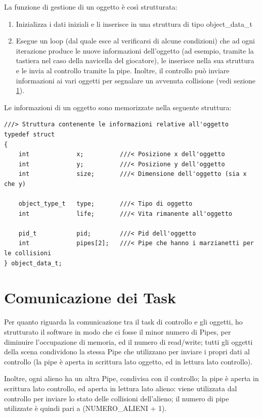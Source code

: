 \documentclass[a4paper,11pt]{report}
\begin{document}
La funzione di gestione di un oggetto è così strutturata:
\begin{enumerate}
  \item Inizializza i dati iniziali e li inserisce in una struttura di tipo object_data_t
  \item Esegue un loop (dal quale esce al verificarsi di alcune condizioni) che ad ogni iterazione 
    produce le nuove informazioni dell'oggetto (ad esempio, tramite la tastiera nel caso
    della navicella del giocatore), le inserisce nella sua struttura e le invia
    al controllo tramite la pipe. Inoltre, il controllo può inviare informazioni ai vari oggetti
    per segnalare un avvenuta collisione (vedi sezione \ref{sec:comun}).
\end{enumerate}

Le informazioni di un oggetto sono memorizzate nella seguente struttura: 

\begin{verbatim}
///> Struttura contenente le informazioni relative all'oggetto
typedef struct
{
	int 			x;			///< Posizione x dell'oggetto
	int				y;			///< Posizione y dell'oggetto
	int 			size;		///< Dimensione dell'oggetto (sia x che y)
	
	object_type_t	type;		///< Tipo di oggetto
	int				life;		///< Vita rimanente all'oggetto
	
	pid_t			pid;		///< Pid dell'oggetto
	int				pipes[2];	///< Pipe che hanno i marzianetti per le collisioni
} object_data_t;
\end{verbatim}


\section{Comunicazione dei Task} \label{sec:comun}
Per quanto riguarda la comunicazione tra il task di controllo e gli oggetti, ho strutturato il software 
in modo che ci fosse il minor numero di Pipes, per diminuire 
l'occupazione di memoria, ed il numero di read/write; tutti gli oggetti della scena
condividono la stessa Pipe che utilizzano per inviare i propri dati al controllo (la pipe è aperta in 
scrittura lato oggetto, ed in lettura lato controllo).

Inoltre, ogni alieno ha un altra Pipe, condivisa con il controllo; la pipe è aperta in scrittura lato 
controllo, ed aperta in lettura lato alieno: viene utilizzata dal controllo per inviare lo stato
delle collisioni dell'alieno; il numero di pipe utilizzate è quindi pari a (NUMERO_ALIENI + 1).
\end{document}
